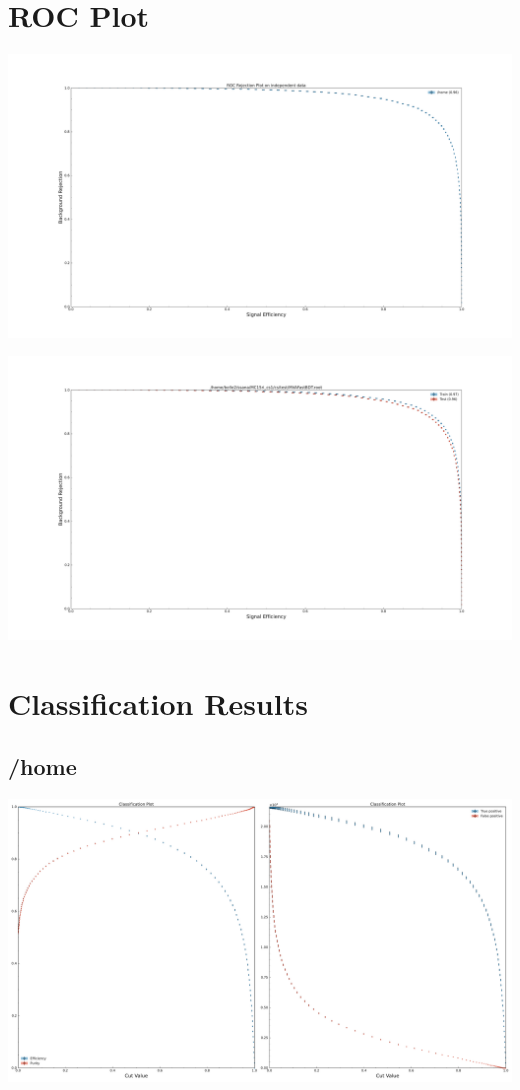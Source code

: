 \documentclass[10pt,a4paper]{article}
\begin{document}
\section{ROC Plot}
\begin{center}
\includegraphics[width=1.0\textwidth]{roc_plot_test.pdf}
\end{center}
\begin{center}
\includegraphics[width=1.0\textwidth]{roc_test_-6845103939654726996.pdf}
\end{center}
\raggedbottom
\pagebreak[0]
\FloatBarrier
\section{Classification Results}
\subsection{/home}
\begin{center}
\includegraphics[width=1\textwidth]{classification_result_-6845103939654726996.pdf}
\end{center}
\raggedbottom
\pagebreak[0]
\FloatBarrier
\end{document}
